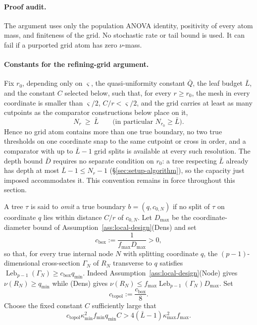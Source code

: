 \documentclass[11pt]{article}
\theoremstyle{plain}
\theoremstyle{definition}
\theoremstyle{remark}
\begin{document}
\paragraph{Proof audit.}
The argument uses only the population ANOVA identity, positivity of every
atom mass, and finiteness of the grid.  No stochastic rate or tail bound is
used.  It can fail if a purported grid atom has zero \(\nu\)-mass.

\paragraph{Constants for the refining-grid argument.}
Fix \(r_0\), depending only on \(\varsigma\), the quasi-uniformity constant
\(\bar Q\), the leaf budget \(\bar L\),
and the constant \(C\) selected below, such that, for every \(r\ge r_0\),
the mesh in every coordinate is smaller than \(\varsigma/2\),
\(C/r<\varsigma/2\), and the grid carries at least as many cutpoints as the
comparator constructions below place on it,
\[
  N_r\ \ge\ \bar L
  \qquad\text{(in particular }N_{r_0}\ge\bar L\text{)}.
\]
Hence no grid atom contains more than one true boundary, no two true
thresholds on one coordinate snap to the same cutpoint or cross in order, and
a comparator with up to \(\bar L-1\) grid splits is available at every such
resolution. The depth bound \(\bar D\) requires no separate condition on
\(r_0\): a tree respecting \(\bar L\) already has depth at most
\(\bar L-1\le N_r-1\) (\S\ref{sec:setup-algorithm}), so the capacity just
imposed accommodates it.
This convention remains in force throughout this section.

A tree \(\tau\) is said to \emph{omit} a true boundary
\(b=(q,c_{0,N})\) if no split of \(\tau\) on coordinate \(q\) lies within
distance \(C/r\) of \(c_{0,N}\).  Let \(D_{\max}\) be the coordinate-diameter
bound of Assumption~\ref{ass:local-design}(Dens) and
set
\[
  c_{\mathrm{box}}:=\frac1{f_{\max}D_{\max}}>0,
\]
so that, for every true internal node \(N\) with splitting coordinate \(q\),
the \((p-1)\)-dimensional cross-section \(\Gamma_N\) of \(R_N\) transverse to
\(q\) satisfies \(\operatorname{Leb}_{p-1}(\Gamma_N)\ge c_{\mathrm{box}}
q_{\min}\).  Indeed Assumption~\ref{ass:local-design}(Node) gives
\(\nu(R_N)\ge q_{\min}\) while (Dens) gives
\(\nu(R_N)\le f_{\max}\operatorname{Leb}_{p-1}(\Gamma_N)D_{\max}\).  Set
\[
  c_{\mathrm{topol}}:=\frac{c_{\mathrm{box}}}{8}.
\]
Choose the fixed constant \(C\) sufficiently large that
\begin{equation}\label{eq:C-margin-choice}
  c_{\mathrm{topol}}\kappa_{\min}^2 f_{\min}q_{\min}C
  >
  4(\bar L-1)\kappa_{\max}^2f_{\max}.
\end{equation}
\end{document}
